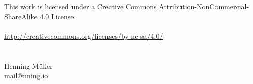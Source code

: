 \begin{center}
	

	\null\vfill
	\thispagestyle{empty}

	\ccbyncsa\\
	~\\

	This work is licensed under a Creative Commons Attribution-NonCommercial-ShareAlike 4.0 License.\\
	~\\

	\url{http://creativecommons.org/licenses/by-nc-sa/4.0/}\\
	~\\
	~\\

	Henning Müller\\
	\href{mailto:mail@nning.io}{mail@nning.io}
\end{center}

